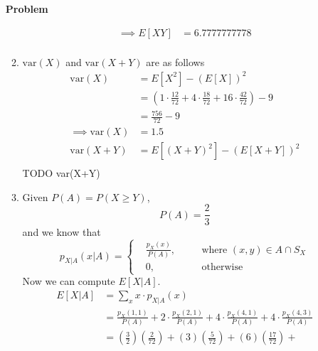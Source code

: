 \documentclass[12pt]{article}
\newenvironment{Ex}{\textbf{Problem}\vspace{.75em}\\}{}
\begin{document}
\begin{enumerate}
\begin{Ex}
\begin{solution}
\begin{enumerate}
\begin{equation}
\begin{aligned}
            \implies E[XY] &= 6.7777777778 \\
          \end{aligned}
        \end{equation}
      \item $\text{var}(X)$ and $\text{var}(X+Y)$ are as follows
        \begin{equation}
          \label{eq:2f-variances}
          \begin{aligned}
            \text{var}(X) &= E[X^2] - (E[X])^2 \\
            &=
            \left(1\cdot\frac{12}{72}+4\cdot\frac{18}{72}+16\cdot\frac{42}{72}\right)
            - 9 \\
            &= \frac{756}{72}-9 \\
            \implies \text{var}(X) &= 1.5 \\
            \text{var}(X+Y) &= E[(X+Y)^2] - (E[X+Y])^2 \\
          \end{aligned}
        \end{equation}
        {\huge TODO var(X+Y)}
      \item Given $P(A) = P(X \ge Y)$,
        \begin{equation}
          \label{eq:2g-decl}
          P(A) = \frac{2}{3}
        \end{equation}
        and we know that
        \begin{equation}
          \label{eq:2g-conditioning}
          p_{X|A}(x|A) = \left\{
            \begin{aligned}
              &\frac{p_{X}(x)}{P(A)}, && \quad\text{where } (x,y) \in
              A \cap S_{X} \\
              &0, && \quad\text{otherwise}
            \end{aligned}\right.
        \end{equation}
        Now we can compute $E[X|A]$.
        \begin{equation}
          \label{eq:2g-e-x-given-a}
          \begin{aligned}
            E[X|A] &= \sum_x x \cdot p_{X|A}(x) \\
            &= \frac{p_X(1,1)}{P(A)} +
            2\cdot\frac{p_X(2,1)}{P(A)} +
            4\cdot\frac{p_X(4,1)}{P(A)} +
            4\cdot\frac{p_X(4,3)}{P(A)} \\
            &= \left(\frac{3}{2}\right)\left(\frac{2}{72}\right) +
            (3)\left(\frac{5}{72}\right) +
            (6)\left(\frac{17}{72}\right) +

\end{aligned}
\end{equation}
\end{enumerate}
\end{solution}
\end{Ex}
\end{enumerate}
\end{document}
